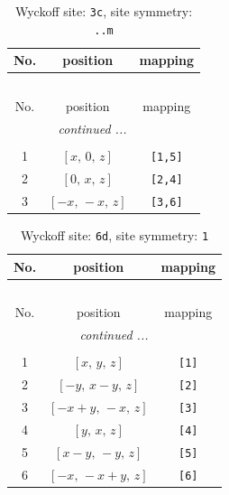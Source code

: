 \documentclass[fleqn,8pt]{jsarticle}
\begin{document}
\begin{longtable}{ccc}
\caption{Wyckoff site: {\tt 3c}, site symmetry: {\tt ..m}}
 \\
 \hline \hline
No. & position & mapping \\ \hline \endfirsthead

\multicolumn{2}{l}{\tablename\ \thetable{}} \\
 \hline \hline
No. & position & mapping \\ \hline \endhead

 \hline \hline
\multicolumn{2}{r}{\footnotesize\it continued ...} \\ \endfoot

 \hline \hline
\multicolumn{2}{r}{} \\ \endlastfoot

1 & $\left[ x,\, 0,\, z \right]$ & {\tt [1,5]} \\ \hline
2 & $\left[ 0,\, x,\, z \right]$ & {\tt [2,4]} \\ \hline
3 & $\left[ - x,\, - x,\, z \right]$ & {\tt [3,6]} \\
\end{longtable}
\renewcommand{\arraystretch}{1.2}
\begin{longtable}{ccc}
\caption{Wyckoff site: {\tt 6d}, site symmetry: {\tt 1}}
 \\
 \hline \hline
No. & position & mapping \\ \hline \endfirsthead

\multicolumn{2}{l}{\tablename\ \thetable{}} \\
 \hline \hline
No. & position & mapping \\ \hline \endhead

 \hline \hline
\multicolumn{2}{r}{\footnotesize\it continued ...} \\ \endfoot

 \hline \hline
\multicolumn{2}{r}{} \\ \endlastfoot

1 & $\left[ x,\, y,\, z \right]$ & {\tt [1]} \\ \hline
2 & $\left[ - y,\, x - y,\, z \right]$ & {\tt [2]} \\ \hline
3 & $\left[ - x + y,\, - x,\, z \right]$ & {\tt [3]} \\ \hline
4 & $\left[ y,\, x,\, z \right]$ & {\tt [4]} \\ \hline
5 & $\left[ x - y,\, - y,\, z \right]$ & {\tt [5]} \\ \hline
6 & $\left[ - x,\, - x + y,\, z \right]$ & {\tt [6]} \\
\end{longtable}
\end{document}
